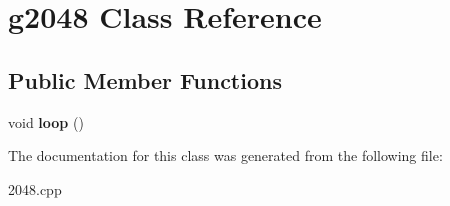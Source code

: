 \hypertarget{classg2048}{}\section{g2048 Class Reference}
\label{classg2048}
\subsection*{Public Member Functions}
\begin{DoxyCompactItemize}
\item 
\hypertarget{classg2048_af48ecfa3840c68d4f910d4f1d65534d2}{}\label{classg2048_af48ecfa3840c68d4f910d4f1d65534d2} 
void {\bfseries loop} ()
\end{DoxyCompactItemize}


The documentation for this class was generated from the following file\+:\begin{DoxyCompactItemize}
\item 
2048.\+cpp\end{DoxyCompactItemize}
